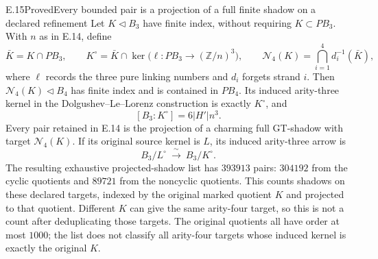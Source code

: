\begin{statement}{E.15}{Proved}{Every bounded pair is a projection of a full finite shadow on a declared refinement}
Let $K\triangleleft B_3$ have finite index, without requiring
$K\subset PB_3$. With $n$ as in E.14, define
\[
 \bar K=K\cap PB_3,\qquad
 K^\circ=\bar K\cap
 \ker\bigl(\ell:PB_3\longrightarrow(\mathbb Z/n)^3\bigr),
 \qquad
 \mathcal N_4(K)=\bigcap_{i=1}^4 d_i^{-1}(\bar K),
\]
where $\ell$ records the three pure linking numbers and $d_i$
forgets strand $i$. Then $\mathcal N_4(K)\triangleleft B_4$ has
finite index and is contained in $PB_4$. Its induced arity-three
kernel in the Dolgushev--Le--Lorenz construction is exactly
$K^\circ$, and
\[
 [B_3:K^\circ]=6|H'|n^3.
\]
Every pair retained in E.14 is the projection of a charming full
GT-shadow with target $\mathcal N_4(K)$. If its original source
kernel is $L$, its induced arity-three arrow is
\[
 B_3/L^\circ\ \xrightarrow{\ \sim\ }\ B_3/K^\circ.
\]
The resulting exhaustive projected-shadow list has $393913$
pairs: $304192$ from the cyclic quotients and $89721$ from the
noncyclic quotients. This counts shadows on these declared targets,
indexed by the original marked quotient $K$ and projected to that
quotient. Different $K$ can give the same arity-four target, so
this is not a count after deduplicating those targets. The original
quotients all have order at most $1000$; the list does
not classify all arity-four targets whose induced kernel is
exactly the original $K$.
\end{statement}
